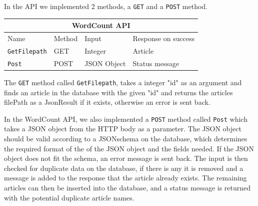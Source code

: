 In the API we implemented 2 methods, a \texttt{GET} and a \texttt{POST} method.
\begin{table}[h]
    \begin{tabular}{|llll|}
    \hline
    \multicolumn{4}{|c|}{\textbf{WordCount API}}                                                                                 \\ \hline
    \multicolumn{1}{|l|}{Name}                 & \multicolumn{1}{l|}{Method} & \multicolumn{1}{l|}{Input}       & Response on success       \\ \hline
    \multicolumn{1}{|l|}{\texttt{GetFilepath}} & \multicolumn{1}{l|}{GET}    & \multicolumn{1}{l|}{Integer}     & Article        \\ \hline
    \multicolumn{1}{|l|}{\texttt{Post}}        & \multicolumn{1}{l|}{POST}   & \multicolumn{1}{l|}{JSON Object} & Status message \\ \hline
    \end{tabular}
    \end{table}

The \texttt{GET} method called \texttt{GetFilepath}, takes a integer "id" as an argument and finds an article in the database with the given "id" and returns the articles filePath as a JsonResult if it exists, otherwise an error is sent back.


In the WordCount API, we also implemented a \texttt{POST} method called \texttt{Post} which takes a JSON object from the HTTP body as a parameter. 
The JSON object should be valid according to a JSONschema on the database, which determines the required format of the of the JSON object and the fields needed. If the JSON object does not fit the schema, an error message is sent back. 
The input is then checked for duplicate data on the database, if there is any it is removed and a message is added to the response that the article already exists. The remaining articles can then be inserted into the database, and a status message is returned with the potential duplicate article names. 
 
